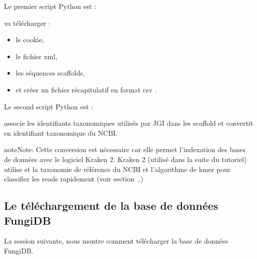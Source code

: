 \documentclass[letterpaper,10pt,french]{sphinxmanual}
\begin{document}
Le premier script Python est :

\begin{sphinxVerbatim}[commandchars=\\\{\}]
\end{sphinxVerbatim}

 va télécharger :
\begin{itemize}
\item {} 
le cookie,

\item {} 
le fichier xml,

\item {} 
les séquences scaffolds,

\item {} 
et créer un fichier récapitulatif en format csv .

\end{itemize}

Le second script Python est :

\begin{sphinxVerbatim}[commandchars=\\\{\}]
\end{sphinxVerbatim}

 associe les identifiants taxonomiques utilisés par JGI dans les scaffold et convertit en identifiant taxonomique du NCBI.

\begin{sphinxadmonition}{note}{Note:}
Cette conversion est nécessaire car elle permet l’indexation des bases de données avec le logiciel Kraken 2. Kraken 2 (utilisé dans la suite du tutoriel) utilise et la taxonomie de référence du NCBI et l’algorithme de k\sphinxhyphen{}mer pour classifier les reads rapidement (voir section ..)
\end{sphinxadmonition}


\subsection{Le téléchargement de la base de données FungiDB}
\label{\detokenize{tutorial:le-telechargement-de-la-base-de-donnees-fungidb}}\label{\detokenize{tutorial:download-fungidb}}
La session suivante, nous montre comment télécharger la base de données FungiDB.
\end{document}
